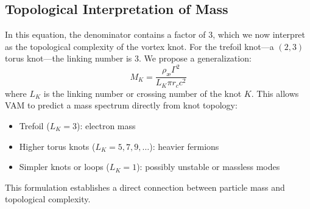 \subsection{Topological Interpretation of Mass}
In this equation, the denominator contains a factor of 3, which we now interpret as the topological complexity of the vortex knot. For the trefoil knot---a $(2,3)$ torus knot---the linking number is 3. We propose a generalization:
\begin{equation}
    M_K = \frac{\rho_\text{\ae} \Gamma^2}{L_K \pi r_c c^2}
\end{equation}
where $L_K$ is the linking number or crossing number of the knot $K$. This allows VAM to predict a mass spectrum directly from knot topology:
\begin{itemize}
    \item Trefoil ($L_K = 3$): electron mass
    \item Higher torus knots ($L_K = 5,7,9,\dots$): heavier fermions
    \item Simpler knots or loops ($L_K = 1$): possibly unstable or massless modes
\end{itemize}
This formulation establishes a direct connection between particle mass and topological complexity.
